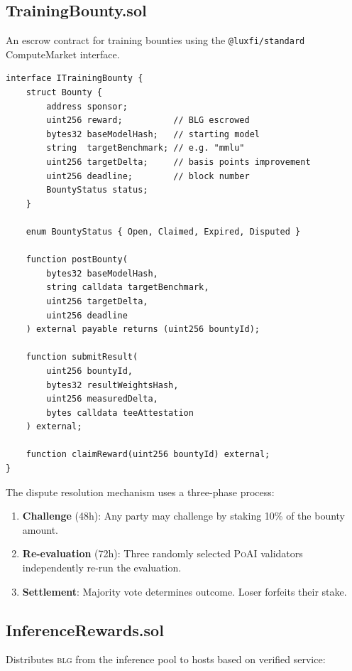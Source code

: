 \documentclass[11pt,letterpaper]{article}
\newcommand{\BLG}{\textsc{blg}}
\newcommand{\PoAI}{\textsc{PoAI}}
\begin{document}
\subsection{TrainingBounty.sol}

An escrow contract for training bounties using the \texttt{@luxfi/standard} ComputeMarket interface.

\begin{lstlisting}[language=Solidity,caption=TrainingBounty core interface]
interface ITrainingBounty {
    struct Bounty {
        address sponsor;
        uint256 reward;          // BLG escrowed
        bytes32 baseModelHash;   // starting model
        string  targetBenchmark; // e.g. "mmlu"
        uint256 targetDelta;     // basis points improvement
        uint256 deadline;        // block number
        BountyStatus status;
    }

    enum BountyStatus { Open, Claimed, Expired, Disputed }

    function postBounty(
        bytes32 baseModelHash,
        string calldata targetBenchmark,
        uint256 targetDelta,
        uint256 deadline
    ) external payable returns (uint256 bountyId);

    function submitResult(
        uint256 bountyId,
        bytes32 resultWeightsHash,
        uint256 measuredDelta,
        bytes calldata teeAttestation
    ) external;

    function claimReward(uint256 bountyId) external;
}
\end{lstlisting}

The dispute resolution mechanism uses a three-phase process:
\begin{enumerate}[nosep]
    \item \textbf{Challenge} (48h): Any party may challenge by staking 10\% of the bounty amount.
    \item \textbf{Re-evaluation} (72h): Three randomly selected \PoAI{} validators independently re-run the evaluation.
    \item \textbf{Settlement}: Majority vote determines outcome. Loser forfeits their stake.
\end{enumerate}

\subsection{InferenceRewards.sol}

Distributes \BLG{} from the inference pool to hosts based on verified service:
\end{document}
